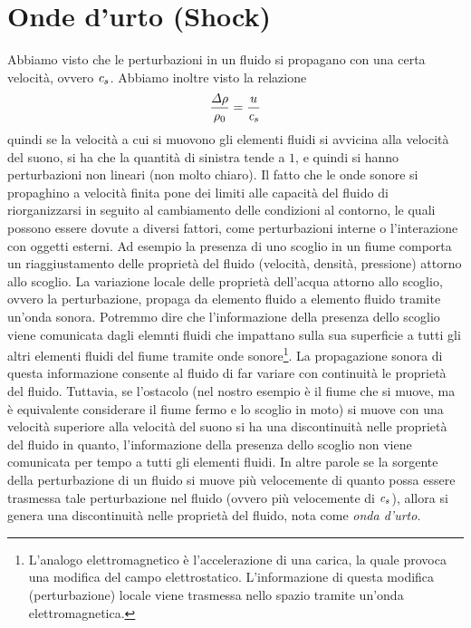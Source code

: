 \section{Onde d'urto (Shock)}
Abbiamo visto che le perturbazioni in un fluido si propagano con una certa velocità, ovvero $\textit{c}_{s}$. Abbiamo inoltre visto la relazione 
\begin{align*}
\dfrac{\Delta \rho}{\rho_0} = \dfrac{u}{\textit{c}_{s}}
\end{align*}
quindi se la velocità a cui si muovono gli elementi fluidi si avvicina alla velocità del suono, si ha che la quantità di sinistra tende a $1$, e quindi si hanno perturbazioni non lineari (non molto chiaro). Il fatto che le onde sonore si propaghino a velocità finita pone dei limiti alle capacità del fluido di riorganizzarsi in seguito al cambiamento delle condizioni al contorno, le quali possono essere dovute a diversi fattori, come perturbazioni interne o l'interazione con oggetti esterni. Ad esempio la presenza di uno scoglio in un fiume comporta un riaggiustamento delle proprietà del fluido (velocità, densità, pressione) attorno allo scoglio. La variazione locale delle proprietà dell'acqua attorno allo scoglio, ovvero la perturbazione, propaga da elemento fluido a elemento fluido tramite un'onda sonora. Potremmo dire che l'informazione della presenza dello scoglio viene comunicata dagli elemnti fluidi che impattano sulla sua superficie a tutti gli altri elementi fluidi del fiume tramite onde sonore\footnote{L'analogo elettromagnetico è l'accelerazione di una carica, la quale provoca una modifica del campo elettrostatico. L'informazione di questa modifica (perturbazione) locale viene trasmessa nello spazio tramite un'onda elettromagnetica.}. La propagazione sonora di questa informazione consente al fluido di far variare con continuità le proprietà del fluido. Tuttavia, se l'ostacolo (nel nostro esempio è il fiume che si muove, ma è equivalente considerare il fiume fermo e lo scoglio in moto) si muove con una velocità superiore alla velocità del suono si ha una discontinuità nelle proprietà del fluido in quanto, l'informazione della presenza dello scoglio non viene comunicata per tempo a tutti gli elementi fluidi. In altre parole se la sorgente della perturbazione di un fluido si muove più velocemente di quanto possa essere trasmessa tale perturbazione nel fluido (ovvero più velocemente di $\textit{c}_{s}$), allora si genera una discontinuità nelle proprietà del fluido, nota come \textit{onda d'urto}.

